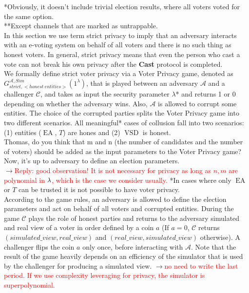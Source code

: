 \documentclass[12pt]{article}
\newcommand{\fix}[2]{\sout{#1}$\rightarrow$\textcolor{red}{#2}}
\DeclareMathOperator{\vsd}{VSD}
\DeclareMathOperator{\ea}{EA}
\begin{document}
*Obviously, it doesn't include trivial election results, where all voters voted for the same option. \\
**Except channels that are marked as untrappable. \\



In this section we use term strict privacy to imply that an adversary interacts with an e-voting system on behalf of all voters and there is no such thing as honest voters. In general, strict privacy means that even the person who cast a vote can not break his own privacy after the \textbf{Cast} protocol is completed. \\

We formally define strict voter privacy via a Voter Privacy game, denoted as $G_{strict,<honest~entities>}^{\mathcal{A}, Sim}(1^{\lambda})$, that is played between an adversary $\mathcal{A}$ and a challenger $\mathcal{C}$, and takes as input the security parameter $\lambda${\color{blue}*} and returns 1 or 0 depending on whether the adversary wins.  Also, $\mathcal{A}$ is  allowed to corrupt some entities. The choice of the corrupted parties splits the Voter Privacy game into two different scenarios. All meaningful* cases of collusion fall into two scenarios: (1) entities ($\ea$, $T$) are hones and (2) $\vsd$ is honest. \\
{\color{blue} Thomas, do you think that m and n (the number of candidates and the number of voters)  should be added as the input parameters to the Voter Privacy game? Now, it's up to adversary to define an election parameters. }\\
\fix{}{Reply: good observation! It is not necessary for privacy as long as $n,m$ are polynomial in $\lambda$, which is the case we consider usually.}
*In cases where only $\ea$ or $T$ can be trusted it is not possible to have voter privacy. \\

 According to the game rules, an adversary is allowed to define the election parameters and act on behalf of all voters and corrupted entities. During the game $\mathcal{C}$ plays the role of honest parties and returns to the adversary simulated and real view of a voter in order defined by a coin $a$ (If $a=0$, $\mathcal{C}$ returns $(simulated\_view,real\_view)$ and  $(real\_view,simulated\_view)$ otherwise). A challenger flips the coin $a$ only once, before interacting with $\mathcal{A}$.  Note that the result of the game heavily depends on an efficiency of the simulator that is used by the challenger for producing a simulated view. \fix{}{no need to write the last period. If we use complexity leveraging for privacy, the simulator is superpolynomial.}\\
\end{document}
